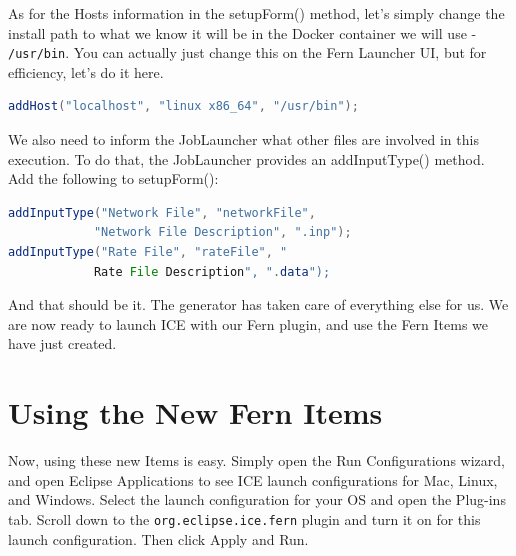 As for the Hosts information in the setupForm() method, let's simply change the
install path to what we know it will be in the Docker container we will use -
\texttt{/usr/bin}.
You can actually just change this on the Fern Launcher UI, but for efficiency, let's
do it here. 
\begin{lstlisting}[language=Java]
addHost("localhost", "linux x86_64", "/usr/bin");
\end{lstlisting}
We also need to inform the JobLauncher what other files are involved in this
execution. To do that, the JobLauncher provides an addInputType() method. Add
the following to setupForm():
\begin{lstlisting}[language=Java]
addInputType("Network File", "networkFile", 
			"Network File Description", ".inp");
addInputType("Rate File", "rateFile", "
			Rate File Description", ".data");
\end{lstlisting}

And that should be it.
The generator has taken care of everything else for us.
We are now ready to launch ICE with our Fern plugin, and use the Fern Items we
have just created.

\section*{Using the New Fern Items}
Now, using these new Items is easy. Simply open the Run Configurations wizard,
and open Eclipse Applications to see ICE launch configurations for Mac, Linux,
and Windows. Select the launch configuration for your OS and open the Plug-ins
tab. Scroll down to the \texttt{org.eclipse.ice.fern} plugin and turn it on for
this launch configuration. Then click Apply and Run. 

